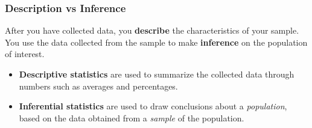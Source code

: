 
\begin{frame}
\frametitle{Description vs Inference}
After you have collected data, you \textbf{describe} the characteristics of your sample.  You use the data collected from the sample to make \textbf{inference} on the population of interest.
\begin{itemize}
    \item
    \textbf{Descriptive statistics} are used to summarize the collected data through numbers such as averages and percentages.
    \item
    \textbf{Inferential statistics} are used to draw conclusions about a \emph{population}, based on the data obtained from a \emph{sample} of the population.
\end{itemize}
\end{frame}

